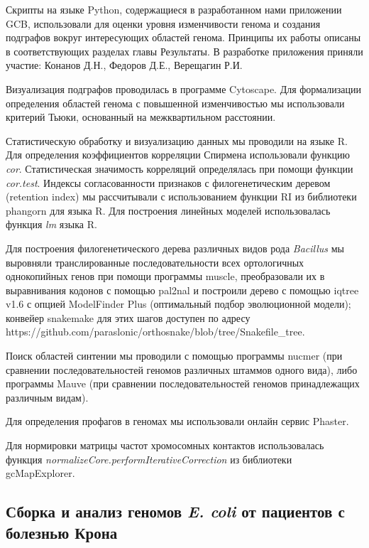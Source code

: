 Скрипты на языке Python, содержащиеся в разработанном нами приложении GCB, использовали для оценки уровня изменчивости генома и создания подграфов вокруг интересующих областей генома. Принципы их работы описаны в соответствующих разделах главы Результаты. В разработке приложения приняли участие: Конанов Д.Н., Федоров Д.Е., Верещагин Р.И.

Визуализация подграфов проводилась в программе Cytoscape. Для формализации определения областей генома с повышенной изменчивостью мы использовали критерий Тьюки, основанный на межквартильном расстоянии.

Статистическую обработку и визуализацию данных мы проводили на языке R. Для определения коэффициентов корреляции Спирмена использовали функцию \textit{cor}. Статистическая значимость корреляций определялась при помощи функции \textit{cor.test}. Индексы согласованности признаков с филогенетическим деревом (retention index) мы рассчитывали с использованием функции RI из библиотеки phangorn для языка R. Для построения линейных моделей использовалась функция \textit{lm} языка R.

Для построения филогенетического дерева различных видов рода \textit{Bacillus} мы выровняли транслированные последовательности всех ортологичных однокопийных генов при помощи программы muscle, преобразовали их в выравнивания кодонов с помощью pal2nal и построили дерево с помощью iqtree v1.6 с опцией ModelFinder Plus (оптимальный подбор эволюционной модели); конвейер snakemake для этих шагов доступен по адресу https://github.com/paraslonic/orthosnake/blob/tree/Snakefile\_tree. 

Поиск областей синтении мы проводили с помощью программы nucmer (при сравнении последовательностей геномов различных штаммов одного вида), либо программы Mauve (при сравнении последовательностей геномов принадлежащих различным видам).

Для определения профагов в геномах мы использовали онлайн сервис Phaster. 

Для нормировки матрицы частот хромосомных контактов использовалась функция \textit{normalizeCore.performIterativeCorrection} из библиотеки gcMapExplorer. 

\subsection*{Сборка и анализ геномов \textit{E. coli} от пациентов с болезнью Крона}

